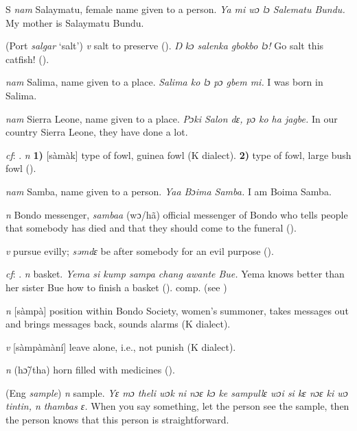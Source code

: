 \begin{letter}{S}
 \textit{nam} Salaymatu, female name given to a person. \textit{Ya mi wɔ lɔ Salematu Bundu.} My mother is Salaymatu Bundu.

 (Port \textit{salgar} ‘salt') \textit{v} salt to preserve (\citealt{Pichl1967}). \textit{Ŋ kɔ salenka gbokbo lɔ!} Go salt this catfish! (\citealt{Pichl1967}).

 \textit{nam} Salima, name given to a place. \textit{Salima ko lɔ pɔ gbem mi.} I was born in Salima.

 \textit{nam} Sierra Leone, name given to a place. \textit{Pɔki Salon dɛ, pɔ ko ha jagbe.} In our country Sierra Leone, they have done a lot.

\textit{cf}: . \textit{n} \textbf{1)} [sàmàk] type of fowl, guinea fowl (K dialect). \textbf{2)} type of fowl, large bush fowl (\citealt{Pichl1967}). 

 \textit{nam} Samba, name given to a person. \textit{Yaa Bɔima Samba.} I am Boima Samba.

 \textit{n} Bondo messenger, \textit{sambaa} (wɔ/hã) official messenger of Bondo who tells people that somebody has died and that they should come to the funeral (\citealt{Pichl1967}). 

 \textit{v} pursue evilly; \textit{səmdɛ} be after somebody for an evil purpose (\citealt{Pichl1967}). 

 \textit{cf}: . \textit{n} basket. \textit{Yema si kump sampa chang awante Bue.} Yema knows better than her sister Bue how to finish a basket (\citealt{Pichl1967}). comp.  (see ) 

 \textit{n} [sàmpà] position within Bondo Society, women's summoner, takes messages out and brings messages back, sounds alarms (K dialect). 

 \textit{v} [sàmpàmàní] leave alone, i.e., not punish (K dialect). 

 \textit{n} (hɔ̃/tha) horn filled with medicines (\citealt{Pichl1967}). 

 (Eng \textit{sample}) \textit{n} sample. \textit{Yɛ mɔ theli wɔk ni nɔɛ kɔ ke sampullɛ wɔi si kɛ nɔɛ ki wɔ tintin, n thambas ɛ.} When you say something, let the person see the sample, then the person knows that this person is straightforward.


\end{letter}
